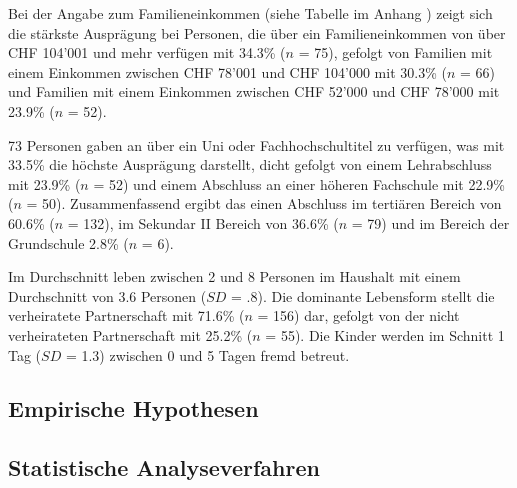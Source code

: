 Bei der Angabe zum Familieneinkommen (siehe Tabelle  im Anhang ) zeigt sich die stärkste Ausprägung bei Personen, die über ein Familieneinkommen von über CHF 104'001 und mehr verfügen mit 34.3\% ($n$ = 75), gefolgt von Familien mit einem Einkommen zwischen CHF 78'001 und CHF 104'000 mit 30.3\% ($n$ = 66) und Familien mit einem Einkommen zwischen CHF 52'000 und CHF 78'000 mit 23.9\% ($n$ = 52). 

73 Personen gaben an über ein Uni oder Fachhochschultitel zu verfügen, was mit 33.5\% die höchste Ausprägung darstellt, dicht gefolgt von einem Lehrabschluss mit 23.9\% ($n$ = 52) und einem Abschluss an einer höheren Fachschule mit 22.9\% ($n$ = 50). Zusammenfassend ergibt das einen Abschluss im tertiären Bereich von 60.6\% ($n$ = 132), im Sekundar II Bereich von 36.6\% ($n$ = 79) und im Bereich der Grundschule 2.8\% ($n$ = 6).

Im Durchschnitt leben zwischen 2 und 8 Personen im Haushalt mit einem Durchschnitt von 3.6 Personen ($SD$ = .8). Die dominante Lebensform stellt die verheiratete Partnerschaft mit 71.6\% ($n$ = 156) dar, gefolgt von der nicht verheirateten Partnerschaft mit 25.2\% ($n$ = 55). Die Kinder werden im Schnitt 1 Tag ($SD$ = 1.3)  zwischen 0 und 5 Tagen fremd betreut.

\subsection{Empirische Hypothesen}\label{sec:EmpirischeHypothesen}
\subsection{Statistische Analyseverfahren}